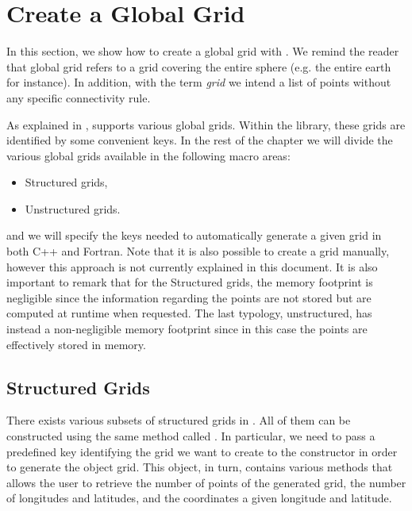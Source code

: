 \chapter{Create a Global Grid}
\label{chap:global-grids}
In this section, we show how to create a global grid with \Atlas.
We remind the reader that global grid refers to a grid covering 
the entire sphere (e.g. the entire earth for instance).
In addition, with the term \textit{grid} we intend a 
list of points without any specific connectivity rule.

As explained in , \Atlas supports various 
global grids. Within the library, these grids are identified 
by some convenient keys. In the rest of the chapter we will 
divide the various global grids available in the following 
macro areas:
%
\begin{itemize}
\item Structured grids,
\item Unstructured grids.
\end{itemize} 
%
and we will specify the keys needed to automatically generate 
a given grid in both C++ and Fortran. Note that it is also possible 
to create a grid manually, however this approach is not currently 
explained in this document.
It is also important to remark that for the Structured grids, the memory
footprint is negligible since the information regarding the points are not 
stored but are computed at runtime when requested.
The last typology, unstructured, has instead a non-negligible memory 
footprint since in this case the points are effectively stored in memory.



\section{Structured Grids}
There exists various subsets of structured grids in \Atlas.
All of them can be constructed using the same method
called . In particular, we need to pass 
a predefined key identifying the grid we want to create 
to the constructor in order to generate the object grid. 
This object, in turn, contains various methods that allows 
the user to retrieve the number of points of the generated 
grid, the number of longitudes and latitudes, and the 
coordinates a given longitude and latitude.

